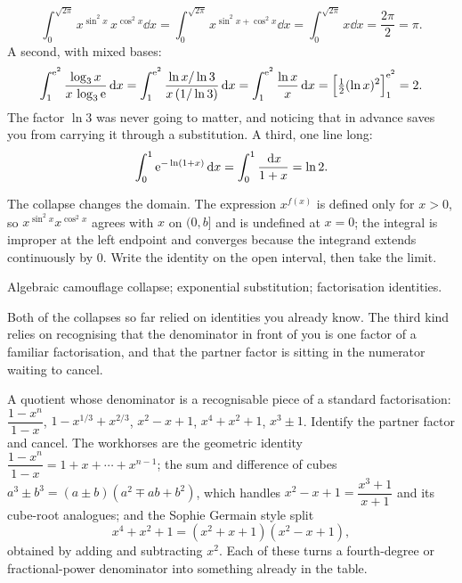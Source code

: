 \begin{worked}
\[
\int_0^{\sqrt{2\pi}}x^{\sin^2x}\,x^{\cos^2x}\dd x=\int_0^{\sqrt{2\pi}}x^{\sin^2x+\cos^2x}\dd x=\int_0^{\sqrt{2\pi}}x\dd x=\frac{2\pi}{2}=\pi .
\]
A second, with mixed bases:
\[
\int_1^{\mathrm{e}^2}\frac{\log_3x}{x\,\log_3\mathrm{e}}\,\mathrm{d} x=\int_1^{\mathrm{e}^2}\frac{\ln x/\ln3}{x\,(1/\ln3)}\,\mathrm{d} x=\int_1^{\mathrm{e}^2}\frac{\ln x}{x}\,\mathrm{d} x=\Bigl[\tfrac12(\ln x)^2\Bigr]_1^{\mathrm{e}^2}=2 .
\]
The factor $\ln 3$ was never going to matter, and noticing that in advance saves you from carrying it through a substitution. A third, one line long:
\[
\int_0^1\mathrm{e}^{-\ln(1+x)}\,\mathrm{d} x=\int_0^1\frac{\,\mathrm{d} x}{1+x}=\ln2 .
\]
\end{worked}

\begin{trap}
The collapse changes the domain. The expression $x^{f(x)}$ is defined only for $x>0$, so $x^{\sin^2x}x^{\cos^2x}$ agrees with $x$ on $(0,b]$ and is undefined at $x=0$; the integral is improper at the left endpoint and converges because the integrand extends continuously by $0$. Write the identity on the open interval, then take the limit.
\end{trap}

\begin{seealsob}Algebraic camouflage collapse; exponential substitution; factorisation identities.\end{seealsob}

Both of the collapses so far relied on identities you already know. The third kind relies on recognising that the denominator in front of you is one factor of a familiar factorisation, and that the partner factor is sitting in the numerator waiting to cancel.

\cue A quotient whose denominator is a recognisable piece of a standard factorisation: $\dfrac{1-x^n}{1-x}$, $1-x^{1/3}+x^{2/3}$, $x^2-x+1$, $x^4+x^2+1$, $x^3\pm1$.
\method Identify the partner factor and cancel. The workhorses are the geometric identity $\dfrac{1-x^n}{1-x}=1+x+\cdots+x^{n-1}$; the sum and difference of cubes $a^3\pm b^3=(a\pm b)(a^2\mp ab+b^2)$, which handles $x^2-x+1=\dfrac{x^3+1}{x+1}$ and its cube-root analogues; and the Sophie Germain style split
\[
x^4+x^2+1=(x^2+x+1)(x^2-x+1),
\]
obtained by adding and subtracting $x^2$. Each of these turns a fourth-degree or fractional-power denominator into something already in the table.

